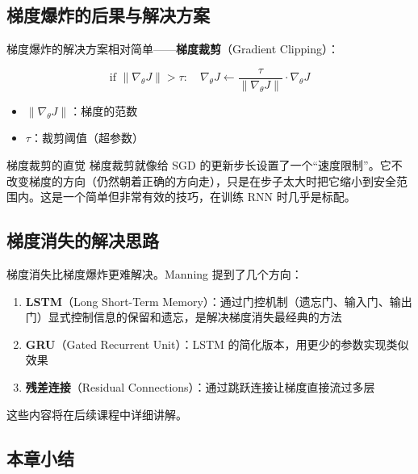 \documentclass[a4paper]{article}
\begin{document}
\subsection{梯度爆炸的后果与解决方案}





梯度爆炸的解决方案相对简单——\textbf{梯度裁剪}（Gradient Clipping）：

$$\text{if } \|\nabla_\theta J\| > \tau: \quad \nabla_\theta J \leftarrow \frac{\tau}{\|\nabla_\theta J\|} \cdot \nabla_\theta J$$

\begin{itemize}
    \item $\|\nabla_\theta J\|$：梯度的范数
    \item $\tau$：裁剪阈值（超参数）
\end{itemize}





\begin{importantbox}{梯度裁剪的直觉}
梯度裁剪就像给 SGD 的更新步长设置了一个``速度限制''。它不改变梯度的方向（仍然朝着正确的方向走），只是在步子太大时把它缩小到安全范围内。这是一个简单但非常有效的技巧，在训练 RNN 时几乎是标配。
\end{importantbox}

\subsection{梯度消失的解决思路}

梯度消失比梯度爆炸更难解决。Manning 提到了几个方向：

\begin{enumerate}
    \item \textbf{LSTM}（Long Short-Term Memory）：通过门控机制（遗忘门、输入门、输出门）显式控制信息的保留和遗忘，是解决梯度消失最经典的方法
    \item \textbf{GRU}（Gated Recurrent Unit）：LSTM 的简化版本，用更少的参数实现类似效果
    \item \textbf{残差连接}（Residual Connections）：通过跳跃连接让梯度直接流过多层
\end{enumerate}

这些内容将在后续课程中详细讲解。

\subsection{本章小结}
\end{document}
